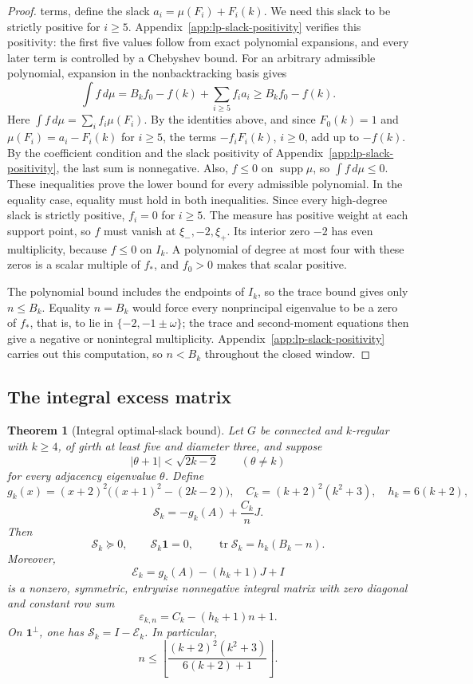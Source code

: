 \documentclass[a4paper,10pt,reqno]{amsart}
\theoremstyle{plain}
\newtheorem{theorem}{Theorem}[section]
\theoremstyle{definition}
\theoremstyle{remark}
\newcommand{\one}{\mathbf 1}
\newcommand{\tr}{\operatorname{tr}}
\newcommand{\resultbox}[1]{\boxed{#1}}
\begin{document}
\begin{proof}
terms, define the slack \(a_i=\mu(F_i)+F_i(k)\). We need this slack to be
strictly positive for \(i\ge5\). Appendix~\ref{app:lp-slack-positivity}
verifies this positivity: the first
five values follow from exact polynomial expansions, and every later term is
controlled by a Chebyshev bound. For an arbitrary admissible polynomial, expansion
in the nonbacktracking basis gives
\[
 \int f\,d\mu
 =B_kf_0-f(k)+\sum_{i\ge5}f_i a_i
 \ge B_kf_0-f(k).
\]
Here \(\int f\,d\mu=\sum_if_i\mu(F_i)\). By the identities above, and since
\(F_0(k)=1\) and \(\mu(F_i)=a_i-F_i(k)\) for \(i\ge5\), the terms
\(-f_iF_i(k)\), \(i\ge0\), add up to \(-f(k)\).
By the coefficient condition and the slack positivity of
Appendix~\ref{app:lp-slack-positivity}, the last sum is nonnegative.
Also,
\(f\le0\) on \(\operatorname{supp}\mu\), so \(\int f\,d\mu\le0\).
These inequalities prove the lower bound for every admissible polynomial.
In the equality case, equality must hold in both inequalities.  Since every high-degree slack
is strictly positive, \(f_i=0\) for \(i\ge5\).  The measure has positive
weight at each support point, so \(f\) must vanish at
\(\xi_-,-2,\xi_+\).  Its interior zero \(-2\) has even multiplicity,
because \(f\le0\) on \(I_k\).  A polynomial of degree at most four with
these zeros is a scalar multiple of \(f_*\), and \(f_0>0\) makes that
scalar positive.

The polynomial bound includes the endpoints of \(I_k\), so the trace bound
gives only \(n\le B_k\). Equality \(n=B_k\) would force every nonprincipal
eigenvalue to be a zero of \(f_*\), that is, to lie in
\(\{-2,-1\pm\omega\}\); the trace and second-moment equations then give a
negative or nonintegral multiplicity. Appendix~\ref{app:lp-slack-positivity}
carries out this computation, so \(n<B_k\) throughout the closed window.
\end{proof}

\subsection{The integral excess matrix}

\begin{theorem}[Integral optimal-slack bound]\label{thm:integral-slack}
Let \(G\) be connected and \(k\)-regular with \(k\ge4\), of girth at least
five and diameter three, and suppose
\[
 \lvert\theta+1\rvert<\sqrt{2k-2}
 \qquad(\theta\ne k)
\]
for every adjacency eigenvalue \(\theta\).  Define
\[
 g_k(x)=(x+2)^2\bigl((x+1)^2-(2k-2)\bigr),\quad
 C_k=(k+2)^2(k^2+3),\quad h_k=6(k+2),
\]
\[
 \mathcal S_k=-g_k(A)+\frac{C_k}{n}J.
\]
Then
\[
 \mathcal S_k\succeq0,\qquad
 \mathcal S_k\one=0,\qquad
 \tr\mathcal S_k=h_k(B_k-n).
\]
Moreover,
\[
 \mathcal E_k=g_k(A)-(h_k+1)J+I
\]
is a nonzero, symmetric, entrywise nonnegative integral matrix with zero
diagonal and constant row sum
\[
 \varepsilon_{k,n}=C_k-(h_k+1)n+1.
\]
On \(\one^\perp\), one has \(\mathcal S_k=I-\mathcal E_k\).  In particular,
\[
 \resultbox{
 n\le
 \left\lfloor
 \frac{(k+2)^2(k^2+3)}{6(k+2)+1}
 \right\rfloor.
 }
\]
\end{theorem}
\end{document}
